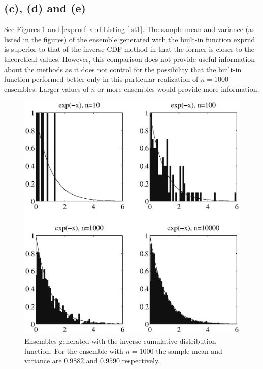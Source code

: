 \documentclass[fleqn, letterpaper]{tufte-handout}
\begin{document}
\subsection{(c), (d) and (e)}
See Figures \ref{rand} and \ref{exprnd} and Listing \ref{lst1}. The sample mean and variance (as listed in the figures) of the ensemble generated with the built-in function {\ttfamily exprnd} is superior to that of the inverse CDF method in that the former is closer to the theoretical values. However, this comparison does not provide useful information about the methods as it does not control for the possibility that the built-in function performed better only in this particular realization of $n=1000$ ensembles. Larger values of $n$ or more ensembles would provide more information.\\
\begin{figure}
        \includegraphics[width=\textwidth]{problem1}
        \caption{Ensembles generated with the inverse cumulative distribution function.
        For the ensemble with $n=1000$ the sample mean and variance are $0.9882$ and $0.9590$ respectively.}
        \label{rand}
\end{figure}
\end{document}

